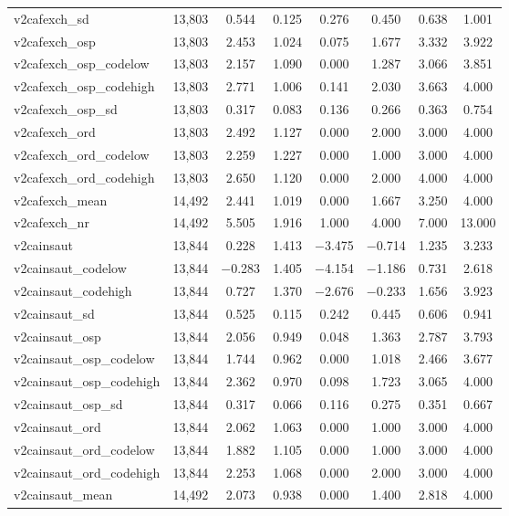 \begin{table}[!htbp]
\begin{tabular}{@{\extracolsep{5pt}}lccccccc}
v2cafexch\_sd & 13,803 & 0.544 & 0.125 & 0.276 & 0.450 & 0.638 & 1.001 \\ 
v2cafexch\_osp & 13,803 & 2.453 & 1.024 & 0.075 & 1.677 & 3.332 & 3.922 \\ 
v2cafexch\_osp\_codelow & 13,803 & 2.157 & 1.090 & 0.000 & 1.287 & 3.066 & 3.851 \\ 
v2cafexch\_osp\_codehigh & 13,803 & 2.771 & 1.006 & 0.141 & 2.030 & 3.663 & 4.000 \\ 
v2cafexch\_osp\_sd & 13,803 & 0.317 & 0.083 & 0.136 & 0.266 & 0.363 & 0.754 \\ 
v2cafexch\_ord & 13,803 & 2.492 & 1.127 & 0.000 & 2.000 & 3.000 & 4.000 \\ 
v2cafexch\_ord\_codelow & 13,803 & 2.259 & 1.227 & 0.000 & 1.000 & 3.000 & 4.000 \\ 
v2cafexch\_ord\_codehigh & 13,803 & 2.650 & 1.120 & 0.000 & 2.000 & 4.000 & 4.000 \\ 
v2cafexch\_mean & 14,492 & 2.441 & 1.019 & 0.000 & 1.667 & 3.250 & 4.000 \\ 
v2cafexch\_nr & 14,492 & 5.505 & 1.916 & 1.000 & 4.000 & 7.000 & 13.000 \\ 
v2cainsaut & 13,844 & 0.228 & 1.413 & $-$3.475 & $-$0.714 & 1.235 & 3.233 \\ 
v2cainsaut\_codelow & 13,844 & $-$0.283 & 1.405 & $-$4.154 & $-$1.186 & 0.731 & 2.618 \\ 
v2cainsaut\_codehigh & 13,844 & 0.727 & 1.370 & $-$2.676 & $-$0.233 & 1.656 & 3.923 \\ 
v2cainsaut\_sd & 13,844 & 0.525 & 0.115 & 0.242 & 0.445 & 0.606 & 0.941 \\ 
v2cainsaut\_osp & 13,844 & 2.056 & 0.949 & 0.048 & 1.363 & 2.787 & 3.793 \\ 
v2cainsaut\_osp\_codelow & 13,844 & 1.744 & 0.962 & 0.000 & 1.018 & 2.466 & 3.677 \\ 
v2cainsaut\_osp\_codehigh & 13,844 & 2.362 & 0.970 & 0.098 & 1.723 & 3.065 & 4.000 \\ 
v2cainsaut\_osp\_sd & 13,844 & 0.317 & 0.066 & 0.116 & 0.275 & 0.351 & 0.667 \\ 
v2cainsaut\_ord & 13,844 & 2.062 & 1.063 & 0.000 & 1.000 & 3.000 & 4.000 \\ 
v2cainsaut\_ord\_codelow & 13,844 & 1.882 & 1.105 & 0.000 & 1.000 & 3.000 & 4.000 \\ 
v2cainsaut\_ord\_codehigh & 13,844 & 2.253 & 1.068 & 0.000 & 2.000 & 3.000 & 4.000 \\ 
v2cainsaut\_mean & 14,492 & 2.073 & 0.938 & 0.000 & 1.400 & 2.818 & 4.000 \\ 

\end{tabular}
\end{table}
